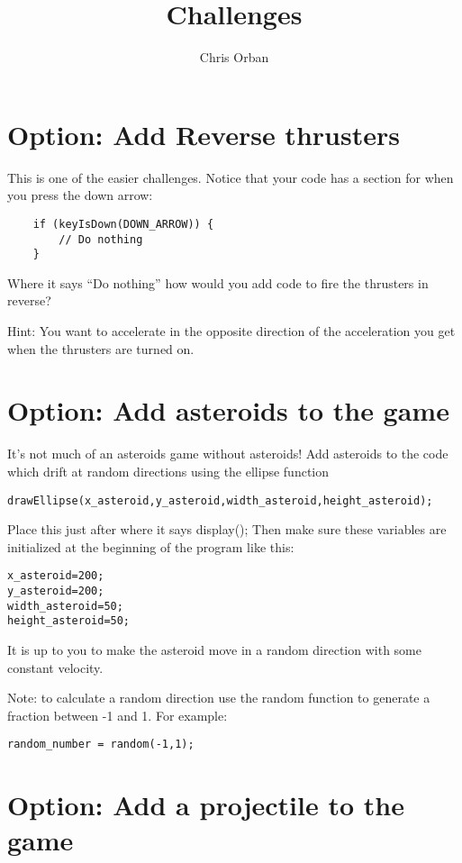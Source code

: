 \documentclass{ximera}
\author{Chris Orban}
\title{Challenges}
\begin{document}
\maketitle

\section{Option: Add Reverse thrusters}

This is one of the easier challenges. Notice that your code has a section for when you press the down arrow:
\begin{verbatim}
    if (keyIsDown(DOWN_ARROW)) {
        // Do nothing                                                           
    }
\end{verbatim}
Where it says ``Do nothing'' how would you add code to fire the thrusters in reverse?

Hint: You want to accelerate in the opposite direction of the acceleration you get when the thrusters are turned on.

\section{Option: Add asteroids to the game}

It's not much of an asteroids game without asteroids! Add asteroids to the code which drift at random directions using the ellipse function
\begin{verbatim}
drawEllipse(x_asteroid,y_asteroid,width_asteroid,height_asteroid);
\end{verbatim}
Place this just after where it says display(); Then make sure these variables are initialized at the beginning of the program like this:
\begin{verbatim}
x_asteroid=200;
y_asteroid=200;
width_asteroid=50;
height_asteroid=50;
\end{verbatim}
It is up to you to make the asteroid move in a random direction with some constant velocity.

Note: to calculate a random direction use the random function to generate a fraction between -1 and 1. For example:
\begin{verbatim}
random_number = random(-1,1);
\end{verbatim}

\section{Option: Add a projectile to the game}
\end{document}
